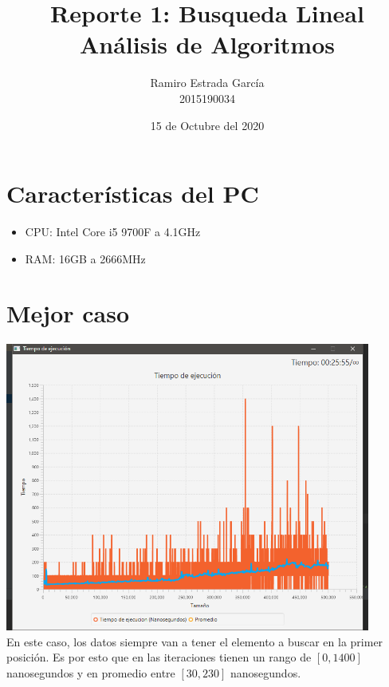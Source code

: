 \documentclass{article}
\title{Reporte 1: Busqueda Lineal\\\textbf{Análisis de Algoritmos}}
\author{ Ramiro Estrada García\\2015190034 }
\date{15 de Octubre del 2020}
\begin{document}
\maketitle
\vspace{5cm}
\section {Características del PC}
\begin{itemize}
	\item CPU: Intel Core i5 9700F a 4.1GHz
	\item RAM: 16GB a 2666MHz
\end{itemize}
\newpage
\maketitle
\section{Mejor caso}
\includegraphics[width=12cm]{mejor.png}\\
En este caso, los datos siempre van a tener el elemento a buscar en la primer posición. 
Es por esto que en las iteraciones tienen un rango de $[0,1400]$ nanosegundos y en promedio entre $[30, 230]$ nanosegundos.
\maketitle
\end{document}
